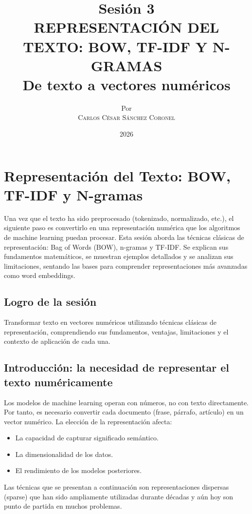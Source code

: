 \documentclass[12pt,a4paper,openany,oneside]{book}
\title{
    \textbf{Sesión 3} \\ 
    \Huge \textbf{REPRESENTACIÓN DEL TEXTO: BOW, TF-IDF Y N-GRAMAS} \\
    \Large De texto a vectores numéricos
}
\author{
    \small Por \\ \vspace{0.2cm}
    \Large \textsc{Carlos César Sánchez Coronel}
}
\date{2026}
\begin{document}
\maketitle
\tableofcontents
{}

\chapter{Representación del Texto: BOW, TF-IDF y N-gramas}

Una vez que el texto ha sido preprocesado (tokenizado, normalizado, etc.), el siguiente paso es convertirlo en una representación numérica que los algoritmos de machine learning puedan procesar. Esta sesión aborda las técnicas clásicas de representación: Bag of Words (BOW), n-gramas y TF-IDF. Se explican sus fundamentos matemáticos, se muestran ejemplos detallados y se analizan sus limitaciones, sentando las bases para comprender representaciones más avanzadas como word embeddings.

\section{Logro de la sesión}
Transformar texto en vectores numéricos utilizando técnicas clásicas de representación, comprendiendo sus fundamentos, ventajas, limitaciones y el contexto de aplicación de cada una.

\section{Introducción: la necesidad de representar el texto numéricamente}
Los modelos de machine learning operan con números, no con texto directamente. Por tanto, es necesario convertir cada documento (frase, párrafo, artículo) en un vector numérico. La elección de la representación afecta:
\begin{itemize}
    \item La capacidad de capturar significado semántico.
    \item La dimensionalidad de los datos.
    \item El rendimiento de los modelos posteriores.
\end{itemize}
Las técnicas que se presentan a continuación son representaciones dispersas (sparse) que han sido ampliamente utilizadas durante décadas y aún hoy son punto de partida en muchos problemas.
\end{document}
